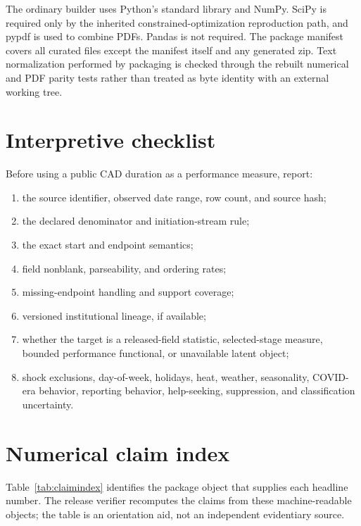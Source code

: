 \documentclass[11pt]{article}
\begin{document}
The ordinary builder uses Python's standard library and NumPy. SciPy is required only by the inherited constrained-optimization reproduction path, and pypdf is used to combine PDFs. Pandas is not required. The package manifest covers all curated files except the manifest itself and any generated zip. Text normalization performed by packaging is checked through the rebuilt numerical and PDF parity tests rather than treated as byte identity with an external working tree.

\section{Interpretive checklist}

Before using a public CAD duration as a performance measure, report:
\begin{enumerate}
\item the source identifier, observed date range, row count, and source hash;
\item the declared denominator and initiation-stream rule;
\item the exact start and endpoint semantics;
\item field nonblank, parseability, and ordering rates;
\item missing-endpoint handling and support coverage;
\item versioned institutional lineage, if available;
\item whether the target is a released-field statistic, selected-stage measure, bounded performance functional, or unavailable latent object;
\item shock exclusions, day-of-week, holidays, heat, weather, seasonality, COVID-era behavior, reporting behavior, help-seeking, suppression, and classification uncertainty.
\end{enumerate}



\clearpage

\section{Numerical claim index}

Table~\ref{tab:claimindex} identifies the package object that supplies each headline number. The release verifier recomputes the claims from these machine-readable objects; the table is an orientation aid, not an independent evidentiary source.
\end{document}
